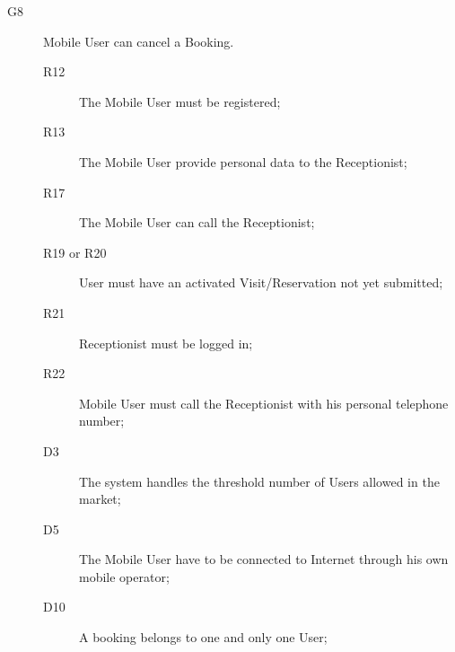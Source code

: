 \begin{description}
    \item[G8]Mobile User can cancel a Booking.
    \begin{description}
    \item[R12] The Mobile User must be registered; %
    \item[R13] The Mobile User provide personal data to the Receptionist; %
    \item[R17] The Mobile User can call the Receptionist;  
    \item[R19 or R20] User must have an activated Visit/Reservation not yet submitted;
    \item[R21] Receptionist must be logged in;
    \item[R22] Mobile User must call the Receptionist with his personal telephone number;
    \item[D3] The system handles the threshold number of Users allowed in the market;
    \item[D5] The Mobile User have to be connected to Internet through his own mobile operator;
    \item[D10] A booking belongs to one and only one User;
    \end{description}
    
    
\end{description}

\pagebreak

